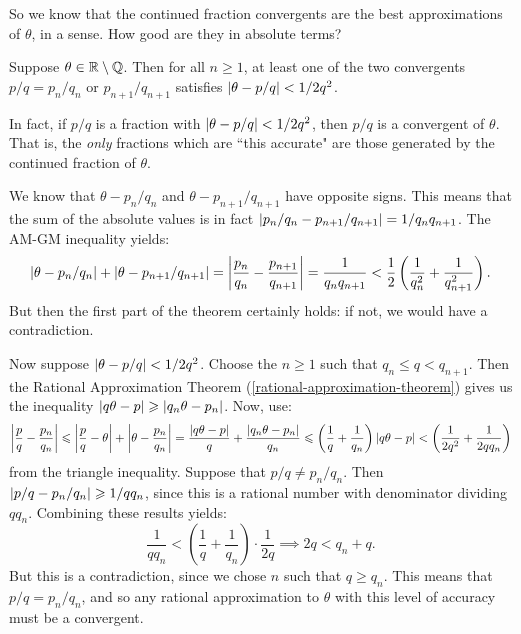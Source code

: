 \documentclass{article}
\begin{document}
So we know that the continued fraction convergents are the best approximations of $\theta$, in a sense. How good are they in absolute terms?

\begin{theorem}
    Suppose $\theta \in \mathbb{R} \setminus \mathbb{Q}$. Then for all $n \geq 1$, at least one of the two convergents $p/q = p_n/q_n$ or $p_{n+1}/q_{n+1}$ satisfies $\left\lvert \theta - p/q \right\rvert < 1/2q^2$.
    
    In fact, if $p/q$ is a fraction with $\left\lvert \theta - p/q \right\rvert < 1/2q^2$, then $p/q$ is a convergent of $\theta$. That is, the \textit{only} fractions which are ``this accurate" are those generated by the continued fraction of $\theta$.
\end{theorem}

\begin{prf}
    We know that $\theta - p_n/q_n$ and $\theta - p_{n+1}/q_{n+1}$ have opposite signs. This means that the sum of the absolute values is in fact $\left\lvert p_n/q_n - p_{n+1}/q_{n+1} \right\rvert = 1/q_nq_{n+1}$.
    The AM-GM inequality yields:
    \[
	\left\lvert \theta - p_n/q_n \right\rvert + \left\lvert \theta - p_{n+1}/q_{n+1} \right\rvert
	= \left\lvert \frac{p_n}{q_n} - \frac{p_{n+1}}{q_{n+1}} \right\rvert = \frac{1}{q_nq_{n+1}} <
	\frac{1}{2} \left( \frac{1}{q_n^2} + \frac{1}{q_{n+1}^2} \right).
	\]
	But then the first part of the theorem certainly holds: if not, we would have a contradiction.
	
	Now suppose $\left\lvert \theta - p/q \right\rvert < 1/2q^2$. Choose the $n \geq 1$ such that $q_n \leq q < q_{n+1}$. Then the Rational Approximation Theorem (\ref{rational-approximation-theorem}) gives us the inequality $\left\lvert q\theta - p \right\rvert \geqslant \left\lvert q_n\theta - p_n \right\rvert$. Now, use:
	\[
	\left\lvert \frac{p}{q} - \frac{p_n}{q_n} \right\rvert \leqslant
	\left\lvert \frac{p}{q} - \theta \right\rvert + \left\lvert \theta - \frac{p_n}{q_n} \right\rvert =
	\frac{\left\lvert q\theta - p \right\rvert}{q} + \frac{\left\lvert q_n\theta - p_n \right\rvert}{q_n} \leqslant
	\left( \frac{1}{q} + \frac{1}{q_n} \right) \left\lvert q\theta - p \right\rvert < \left( \frac{1}{2q^2} + \frac{1}{2qq_n} \right)
	\]
	from the triangle inequality. Suppose that $p/q \neq p_n/q_n$. Then $\left\lvert p/q - p_n/q_n \right\rvert \geqslant 1/qq_{n}$, since this is a rational number with denominator dividing $qq_n$. Combining these results yields:
	\[
	\frac{1}{qq_n} < \left( \frac{1}{q} + \frac{1}{q_n} \right) \cdot \frac{1}{2q} \implies 2q < q_n + q.
	\]
	But this is a contradiction, since we chose $n$ such that $q \geq q_n$. This means that $p/q = p_n/q_n$, and so any rational approximation to $\theta$ with this level of accuracy must be a convergent.
\end{prf}
\end{document}
